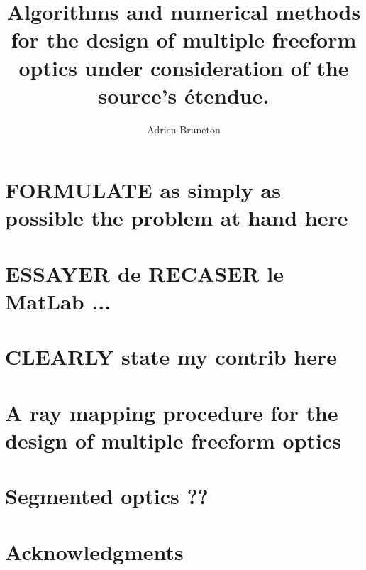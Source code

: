 \documentclass[10pt,a4paper,draft]{book}
\author{Adrien Bruneton}
\title{Algorithms and numerical methods for the design of multiple freeform optics
under consideration of the source's étendue.}
\numberwithin{equation}{section}
\numberwithin{figure}{section}
\begin{document}
\maketitle
\tableofcontents



\chapter{FORMULATE as simply as possible the problem at hand here}
\chapter{ESSAYER de RECASER le MatLab ... }



\chapter{CLEARLY state my contrib here}

\chapter{A ray mapping procedure for the design of multiple freeform optics}
\label{ch:core}










% 
\chapter{Segmented optics ??}



\chapter{Acknowledgments}

%


\end{document}
